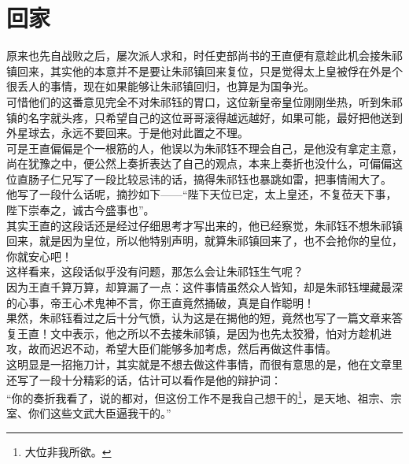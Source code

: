 \section{回家}
\ifnum{}
	\begin{multicols}{\theparacolNo}
\fi
原来也先自战败之后，屡次派人求和，时任吏部尚书的王直便有意趁此机会接朱祁镇回来，其实他的本意并不是要让朱祁镇回来复位，只是觉得太上皇被俘在外是个很丢人的事情，现在如果能够让朱祁镇回归，也算是为国争光。\\

可惜他们的这番意见完全不对朱祁钰的胃口，这位新皇帝皇位刚刚坐热，听到朱祁镇的名字就头疼，只希望自己的这位哥哥滚得越远越好，如果可能，最好把他送到外星球去，永远不要回来。于是他对此置之不理。\\

可是王直偏偏是个一根筋的人，他误以为朱祁钰不理会自己，是他没有拿定主意，尚在犹豫之中，便公然上奏折表达了自己的观点，本来上奏折也没什么，可偏偏这位直肠子仁兄写了一段比较忌讳的话，搞得朱祁钰也暴跳如雷，把事情闹大了。\\

他写了一段什么话呢，摘抄如下——“陛下天位已定，太上皇还，不复莅天下事，陛下崇奉之，诚古今盛事也”。\\

其实王直的这段话还是经过仔细思考才写出来的，他已经察觉，朱祁钰不想朱祁镇回来，就是因为皇位，所以他特别声明，就算朱祁镇回来了，也不会抢你的皇位，你就安心吧！\\

这样看来，这段话似乎没有问题，那怎么会让朱祁钰生气呢？\\

因为王直千算万算，却算漏了一点：这件事情虽然众人皆知，却是朱祁钰埋藏最深的心事，帝王心术鬼神不言，你王直竟然捅破，真是自作聪明！\\

果然，朱祁钰看过之后十分气愤，认为这是在揭他的短，竟然也写了一篇文章来答复王直！文中表示，他之所以不去接朱祁镇，是因为也先太狡猾，怕对方趁机进攻，故而迟迟不动，希望大臣们能够多加考虑，然后再做这件事情。\\

这明显是一招拖刀计，其实就是不想去做这件事情，而很有意思的是，他在文章里还写了一段十分精彩的话，估计可以看作是他的辩护词：\\

“你的奏折我看了，说的都对，但这份工作不是我自己想干的\footnote{大位非我所欲。}，是天地、祖宗、宗室、你们这些文武大臣逼我干的。”\\


\end{multicols}
